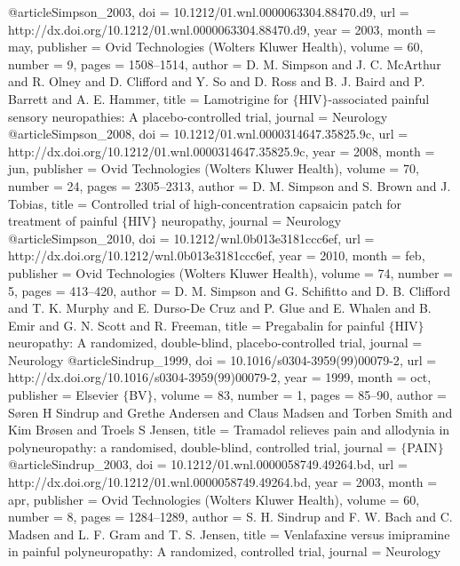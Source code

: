 @article{Simpson_2003,
	doi = {10.1212/01.wnl.0000063304.88470.d9},
	url = {http://dx.doi.org/10.1212/01.wnl.0000063304.88470.d9},
	year = 2003,
	month = {may},
	publisher = {Ovid Technologies (Wolters Kluwer Health)},
	volume = {60},
	number = {9},
	pages = {1508--1514},
	author = {D. M. Simpson and J. C. McArthur and R. Olney and D. Clifford and Y. So and D. Ross and B. J. Baird and P. Barrett and A. E. Hammer},
	title = {Lamotrigine for $\lbrace$HIV$\rbrace$-associated painful sensory neuropathies: A placebo-controlled trial},
	journal = {Neurology}
}
@article{Simpson_2008,
	doi = {10.1212/01.wnl.0000314647.35825.9c},
	url = {http://dx.doi.org/10.1212/01.wnl.0000314647.35825.9c},
	year = 2008,
	month = {jun},
	publisher = {Ovid Technologies (Wolters Kluwer Health)},
	volume = {70},
	number = {24},
	pages = {2305--2313},
	author = {D. M. Simpson and S. Brown and J. Tobias},
	title = {Controlled trial of high-concentration capsaicin patch for treatment of painful $\lbrace$HIV$\rbrace$ neuropathy},
	journal = {Neurology}
}
@article{Simpson_2010,
	doi = {10.1212/wnl.0b013e3181ccc6ef},
	url = {http://dx.doi.org/10.1212/wnl.0b013e3181ccc6ef},
	year = 2010,
	month = {feb},
	publisher = {Ovid Technologies (Wolters Kluwer Health)},
	volume = {74},
	number = {5},
	pages = {413--420},
	author = {D. M. Simpson and G. Schifitto and D. B. Clifford and T. K. Murphy and E. Durso-De Cruz and P. Glue and E. Whalen and B. Emir and G. N. Scott and R. Freeman},
	title = {Pregabalin for painful $\lbrace$HIV$\rbrace$ neuropathy: A randomized, double-blind, placebo-controlled trial},
	journal = {Neurology}
}
@article{Sindrup_1999,
	doi = {10.1016/s0304-3959(99)00079-2},
	url = {http://dx.doi.org/10.1016/s0304-3959(99)00079-2},
	year = 1999,
	month = {oct},
	publisher = {Elsevier $\lbrace$BV$\rbrace$},
	volume = {83},
	number = {1},
	pages = {85--90},
	author = {S{\o}ren H Sindrup and Grethe Andersen and Claus Madsen and Torben Smith and Kim Br{\o}sen and Troels S Jensen},
	title = {Tramadol relieves pain and allodynia in polyneuropathy: a randomised, double-blind, controlled trial},
	journal = {$\lbrace$PAIN$\rbrace$}
}
@article{Sindrup_2003,
	doi = {10.1212/01.wnl.0000058749.49264.bd},
	url = {http://dx.doi.org/10.1212/01.wnl.0000058749.49264.bd},
	year = 2003,
	month = {apr},
	publisher = {Ovid Technologies (Wolters Kluwer Health)},
	volume = {60},
	number = {8},
	pages = {1284--1289},
	author = {S. H. Sindrup and F. W. Bach and C. Madsen and L. F. Gram and T. S. Jensen},
	title = {Venlafaxine versus imipramine in painful polyneuropathy: A randomized, controlled trial},
	journal = {Neurology}
}
